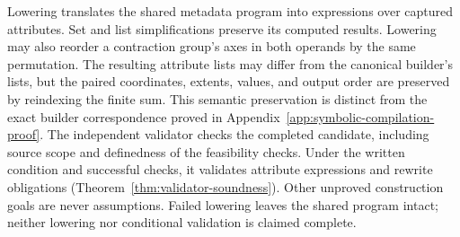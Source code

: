 Lowering translates the shared metadata program into expressions over
captured attributes. Set and list simplifications preserve its computed
results. Lowering may also reorder a contraction group's axes in both
operands by the same permutation. The resulting attribute lists may differ
from the canonical builder's lists, but the paired coordinates, extents,
values, and output order are preserved by reindexing the finite sum.
This semantic preservation is distinct from the exact builder correspondence
proved in Appendix~\ref{app:symbolic-compilation-proof}.
The independent validator checks the completed candidate, including
source scope and definedness of the feasibility checks. Under
the written condition and successful checks, it validates attribute
expressions and rewrite obligations (Theorem~\ref{thm:validator-soundness}).
Other unproved construction goals are never assumptions. Failed lowering
leaves the shared program intact; neither lowering nor conditional
validation is claimed complete.
